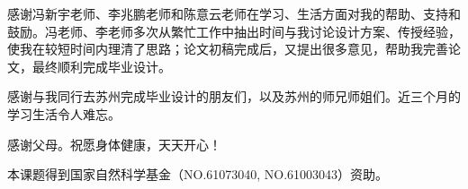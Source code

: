 \begin{thankspage}
感谢冯新宇老师、李兆鹏老师和陈意云老师在学习、生活方面对我的帮助、支持和鼓励。冯老师、李老师多次从繁忙工作中抽出时间与我讨论设计方案、传授经验，使我在较短时间内理清了思路；论文初稿完成后，又提出很多意见，帮助我完善论文，最终顺利完成毕业设计。

感谢与我同行去苏州完成毕业设计的朋友们，以及苏州的师兄师姐们。近三个月的学习生活令人难忘。

感谢父母。祝愿身体健康，天天开心！

\hfill
\par
本课题得到国家自然科学基金（NO.61073040, NO.61003043）资助。
\end{thankspage}
